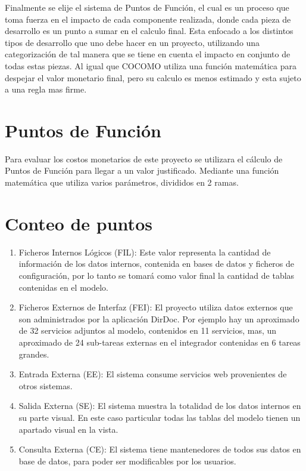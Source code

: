 \documentclass[a4paper,12pt,openany,oneside]{book}
\begin{document}
Finalmente se elije el sistema de Puntos de Función, el cual es un proceso que toma fuerza en el impacto de cada componente realizada, donde cada pieza de desarrollo es un punto a sumar en el calculo final. Esta enfocado a los distintos tipos de desarrollo que uno debe hacer en un proyecto, utilizando una categorización de tal manera que se tiene en cuenta el impacto en conjunto de todas estas piezas. Al igual que COCOMO utiliza una función matemática para despejar el valor monetario final, pero su calculo es menos estimado y esta sujeto a una regla mas firme.
\section{Puntos de Función}
Para evaluar los costos monetarios de este proyecto se utilizara el cálculo de Puntos de Función para llegar a un valor justificado. Mediante una función matemática que utiliza varios parámetros, divididos en 2 ramas.

\section{Conteo de puntos}

\begin{enumerate}
	\item Ficheros Internos Lógicos (FIL): Este valor representa la cantidad de información de los datos internos, contenida en bases de datos y ficheros de configuración, por lo tanto se tomará como valor final la cantidad de tablas contenidas en el modelo.
	\item Ficheros Externos de Interfaz (FEI): El proyecto utiliza datos externos que son administrados por la aplicación DirDoc. Por ejemplo hay un aproximado de 32 servicios adjuntos al modelo, contenidos en 11 servicios, mas, un aproximado de 24 sub-tareas externas en el integrador contenidas en 6 tareas grandes.
	\item Entrada Externa (EE): El sistema consume servicios web provenientes de otros sistemas.
	\item Salida Externa (SE): El sistema muestra la totalidad de los datos internos en su parte visual. En este caso particular todas las tablas del modelo tienen un apartado visual en la vista.
	\item Consulta Externa (CE): El sistema tiene mantenedores de todos sus datos en base de datos, para poder ser modificables por los usuarios.
\end{enumerate}
\end{document}
